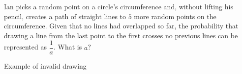 Ian picks a random point on a circle's circumference and, without lifting his pencil, creates a path of straight lines to $5$ more random points on the circumference. Given that no lines had overlapped so far, the probability that drawing a line from the last point to the first crosses no previous lines can be represented as $\dfrac{1}{a}$. What is $a$?

Example of invalid drawing

